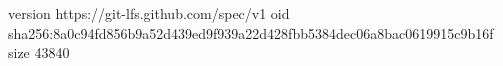 version https://git-lfs.github.com/spec/v1
oid sha256:8a0c94fd856b9a52d439ed9f939a22d428fbb5384dec06a8bac0619915c9b16f
size 43840
